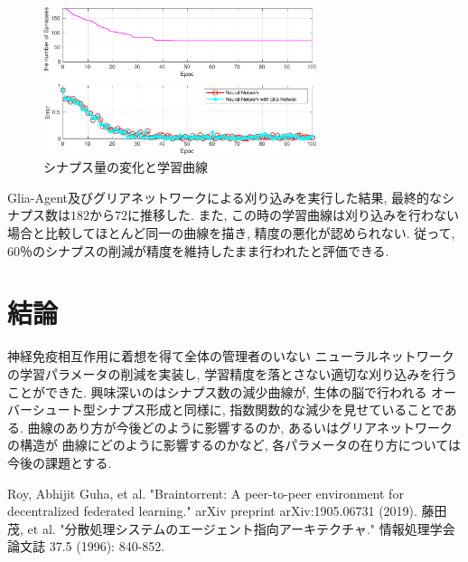\documentclass[a4paper, 9pt,twocolumn,dvipdfmx]{jsarticle}
\begin{document}
\vspace{-2zh}
\begin{figure}[H]
  \centering
  \includegraphics[width=8cm]{Subploting-crop.pdf} 
  \caption{シナプス量の変化と学習曲線}
  \label{fig:SynapseNum}
\end{figure}
\vspace{-2zh}

Glia-Agent及びグリアネットワークによる刈り込みを実行した結果, 最終的なシナプス数は$182$から$72$に推移した. 
また, この時の学習曲線は刈り込みを行わない場合と比較してほとんど同一の曲線を描き, 
精度の悪化が認められない.
従って, 60％のシナプスの削減が精度を維持したまま行われたと評価できる.
\section{結論}
神経免疫相互作用に着想を得て全体の管理者のいない
ニューラルネットワークの学習パラメータの削減を実装し, 
学習精度を落とさない適切な刈り込みを行うことができた.
興味深いのはシナプス数の減少曲線が, 生体の脳で行われる
オーバーシュート型シナプス形成と同様に, 
指数関数的な減少を見せていることである. 
曲線のあり方が今後どのように影響するのか, 
あるいはグリアネットワークの構造が
曲線にどのように影響するのかなど, 
各パラメータの在り方については今後の課題とする.
 \begin{thebibliography}{99}
  Roy, Abhijit Guha, et al. "Braintorrent: A peer-to-peer environment for decentralized federated learning." arXiv preprint arXiv:1905.06731 (2019).
  藤田茂, et al. "分散処理システムのエージェント指向アーキテクチャ." 情報処理学会論文誌 37.5 (1996): 840-852.
\end{thebibliography}
 
\end{document}
